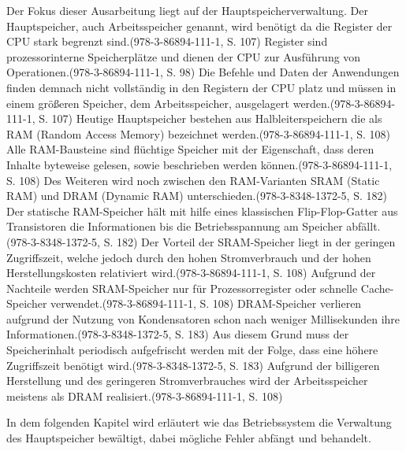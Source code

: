 Der Fokus dieser Ausarbeitung liegt auf der Hauptspeicherverwaltung. Der Hauptspeicher, auch Arbeitsspeicher genannt, wird benötigt da die Register der CPU stark begrenzt sind.(978-3-86894-111-1, S. 107) Register sind prozessorinterne Speicherplätze und dienen der CPU zur Ausführung von Operationen.(978-3-86894-111-1, S. 98) Die Befehle und Daten der Anwendungen finden demnach nicht vollständig in den Registern der CPU platz und müssen in einem größeren Speicher, dem Arbeitsspeicher, ausgelagert werden.(978-3-86894-111-1, S. 107) Heutige Hauptspeicher bestehen aus Halbleiterspeichern die als RAM (Random Access Memory) bezeichnet werden.(978-3-86894-111-1, S. 108) Alle RAM-Bausteine sind flüchtige Speicher mit der Eigenschaft, dass deren Inhalte byteweise gelesen, sowie beschrieben werden können.(978-3-86894-111-1, S. 108) Des Weiteren wird noch zwischen den RAM-Varianten SRAM (Static RAM) und DRAM (Dynamic RAM) unterschieden.(978-3-8348-1372-5, S. 182) Der statische RAM-Speicher hält mit hilfe eines klassischen Flip-Flop-Gatter aus Transistoren die Informationen bis die Betriebsspannung am Speicher abfällt.(978-3-8348-1372-5, S. 182) Der Vorteil der SRAM-Speicher liegt in der geringen Zugriffszeit, welche jedoch durch den hohen Stromverbrauch und der hohen Herstellungskosten relativiert wird.(978-3-86894-111-1, S. 108) Aufgrund der Nachteile werden SRAM-Speicher nur für Prozessorregister oder schnelle Cache-Speicher verwendet.(978-3-86894-111-1, S. 108) DRAM-Speicher verlieren aufgrund der Nutzung von Kondensatoren schon nach weniger Millisekunden ihre Informationen.(978-3-8348-1372-5, S. 183) Aus diesem Grund muss der Speicherinhalt periodisch aufgefrischt werden mit der Folge, dass eine höhere Zugriffszeit benötigt wird.(978-3-8348-1372-5, S. 183) Aufgrund der billigeren Herstellung und des geringeren Stromverbrauches wird der Arbeitsspeicher meistens als DRAM realisiert.(978-3-86894-111-1, S. 108)

In dem folgenden Kapitel wird erläutert wie das Betriebssystem die Verwaltung des Hauptspeicher bewältigt, dabei mögliche Fehler abfängt und behandelt.
